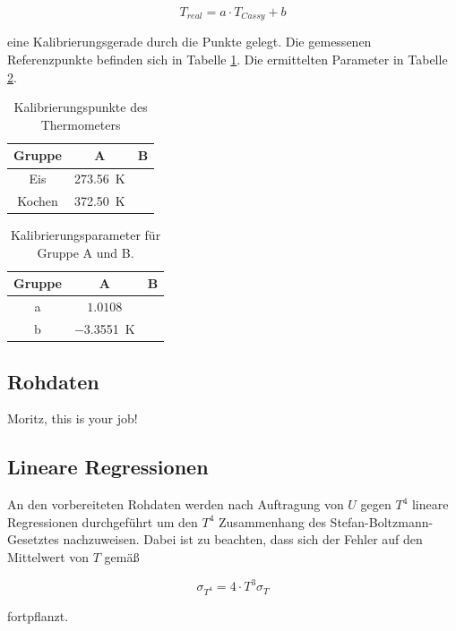 \documentclass[12pt,a4paper]{article}
\begin{document}
\begin{equation}
T_{real} = a \cdot T_{Cassy} + b
\end{equation}

eine Kalibrierungsgerade durch die Punkte gelegt. Die gemessenen Referenzpunkte befinden sich in Tabelle \ref{tab:Kalibrierung}. Die ermittelten Parameter in Tabelle \ref{tab:Parameter}.

\begin{table}
\centering
\begin{tabular}{|c|c|c|}
\hline
Gruppe & A & B \\
\hline
Eis & \SI{273.56}{\K} & \\
\hline
Kochen & \SI{372.50}{\K} & \\
\hline 
\end{tabular}
\caption{Kalibrierungspunkte des Thermometers}
\label{tab:Kalibrierung}
\end{table}

\begin{table}
\centering
\begin{tabular}{|c|c|c|}
\hline
Gruppe & A & B \\
\hline
a & $1.0108$ & \\
\hline
b & \SI{-3.3551}{\K} & \\
\hline
\end{tabular}
\caption{Kalibrierungsparameter für Gruppe A und B.}
\label{tab:Parameter}
\end{table}

\subsection{Rohdaten}
Moritz, this is your job!


\subsection{Lineare Regressionen}
An den vorbereiteten Rohdaten werden nach Auftragung von $U$ gegen $T^4$ lineare Regressionen durchgeführt um den $T^4$ Zusammenhang des Stefan-Boltzmann-Gesetztes nachzuweisen. Dabei ist zu beachten, dass sich der Fehler auf den Mittelwert von $T$ gemäß 

\begin{equation}
\sigma_{T^4} = 4 \cdot T^3 \sigma_T
\end{equation}

fortpflanzt.
\end{document}
